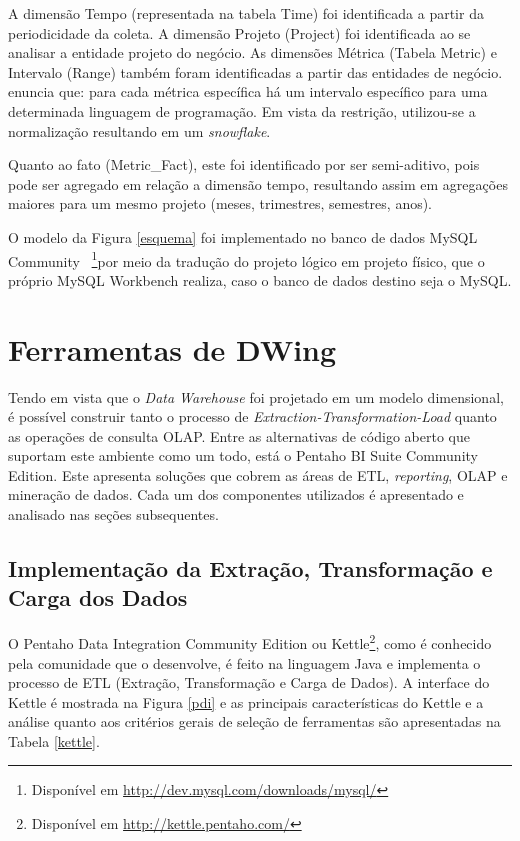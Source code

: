 A dimensão Tempo (representada na tabela Time) foi identificada a partir da periodicidade da coleta. A dimensão Projeto (Project) foi identificada ao se analisar a entidade projeto do negócio. As dimensões Métrica (Tabela Metric) e Intervalo (Range) também foram identificadas a partir das entidades de negócio.  enuncia que: para cada métrica específica há um intervalo específico para uma determinada linguagem de programação. Em vista da restrição, utilizou-se a normalização resultando em um \textit{snowflake}.

Quanto ao fato (Metric\_Fact), este foi identificado por ser semi-aditivo, pois pode ser agregado em relação a dimensão tempo, resultando assim em agregações maiores para um mesmo projeto (meses, trimestres, semestres, anos).


O modelo da Figura \ref{esquema} foi implementado no banco de dados MySQL Community ~\footnote{Disponível em \url{http://dev.mysql.com/downloads/mysql/}}por meio da tradução do projeto lógico em projeto físico, que o próprio MySQL Workbench realiza, caso o banco de dados destino seja o MySQL.

\section{Ferramentas de DWing}

Tendo em vista que o \textit{Data Warehouse} foi projetado em um modelo dimensional, é possível construir tanto o processo de \textit{Extraction-Transformation-Load} quanto as operações de consulta OLAP. Entre as alternativas de código aberto que suportam este ambiente como um todo, está o Pentaho BI Suite Community Edition. Este apresenta soluções que cobrem 
as áreas de ETL, \textit{reporting}, OLAP e mineração de dados. Cada um dos componentes utilizados é apresentado e analisado nas seções subsequentes.
 


\subsection{Implementação da Extração, Transformação e Carga dos Dados}
\label{implementação-ETL}
O Pentaho Data Integration Community Edition ou Kettle\footnote{Disponível em \url{http://kettle.pentaho.com/}}, como é conhecido pela comunidade que o desenvolve, é feito na linguagem Java e implementa o processo de ETL (Extração, Transformação e Carga de Dados). A interface do Kettle é mostrada na Figura \ref{pdi} e as principais características do Kettle e a análise quanto aos critérios gerais de seleção de ferramentas são apresentadas na Tabela \ref{kettle}.

